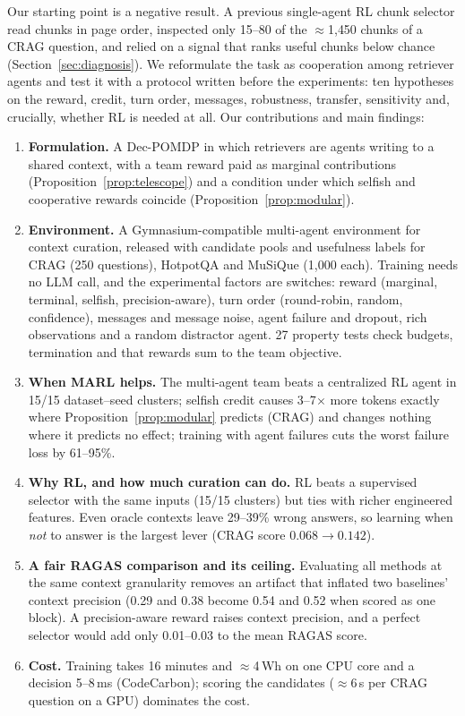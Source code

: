 \documentclass[sigconf,anonymous]{aamas}
\theoremstyle{plain}
\theoremstyle{definition}
\begin{document}
Our starting point is a negative result. A previous single-agent RL chunk selector read chunks in page order, inspected only 15--80 of the $\approx$1{,}450 chunks of a CRAG question, and relied on a signal that ranks useful chunks below chance (Section~\ref{sec:diagnosis}). We reformulate the task as cooperation among retriever agents and test it with a protocol written before the experiments: ten hypotheses on the reward, credit, turn order, messages, robustness, transfer, sensitivity and, crucially, whether RL is needed at all. Our contributions and main findings:
\begin{enumerate}
  \item \textbf{Formulation.} A Dec-POMDP in which retrievers are agents writing to a shared context, with a team reward paid as marginal contributions (Proposition~\ref{prop:telescope}) and a condition under which selfish and cooperative rewards coincide (Proposition~\ref{prop:modular}).
  \item \textbf{Environment.} A Gymnasium-compatible multi-agent environment for context curation, released with candidate pools and usefulness labels for CRAG (250 questions), HotpotQA and MuSiQue (1{,}000 each). Training needs no LLM call, and the experimental factors are switches: reward (marginal, terminal, selfish, precision-aware), turn order (round-robin, random, confidence), messages and message noise, agent failure and dropout, rich observations and a random distractor agent. 27 property tests check budgets, termination and that rewards sum to the team objective.
  \item \textbf{When MARL helps.} The multi-agent team beats a centralized RL agent in 15/15 dataset--seed clusters; selfish credit causes 3--7$\times$ more tokens exactly where Proposition~\ref{prop:modular} predicts (CRAG) and changes nothing where it predicts no effect; training with agent failures cuts the worst failure loss by 61--95\%.
  \item \textbf{Why RL, and how much curation can do.} RL beats a supervised selector with the same inputs (15/15 clusters) but ties with richer engineered features. Even oracle contexts leave 29--39\% wrong answers, so learning when \emph{not} to answer is the largest lever (CRAG score $0.068\to0.142$).
  \item \textbf{A fair RAGAS comparison and its ceiling.} Evaluating all methods at the same context granularity removes an artifact that inflated two baselines' context precision (0.29 and 0.38 become 0.54 and 0.52 when scored as one block). A precision-aware reward raises context precision, and a perfect selector would add only 0.01--0.03 to the mean RAGAS score.
  \item \textbf{Cost.} Training takes 16 minutes and $\approx$4\,Wh on one CPU core and a decision 5--8\,ms (CodeCarbon); scoring the candidates ($\approx$6\,s per CRAG question on a GPU) dominates the cost.
\end{enumerate}
\end{document}
